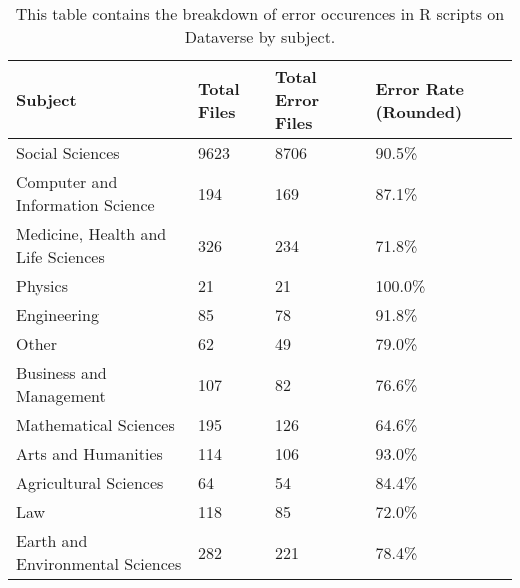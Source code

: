 \begin{table}
\centering
\caption{This table contains the breakdown of error occurences in R scripts on Dataverse by subject.}
\label{tab:subject-breakdown}
\begin{tabular}{llll}
\toprule
                           Subject & Total Files & Total Error Files & Error Rate (Rounded) \\
\midrule
                   Social Sciences &        9623 &              8706 &                90.5\% \\ \hline
  Computer and Information Science &         194 &               169 &                87.1\% \\ \hline
Medicine, Health and Life Sciences &         326 &               234 &                71.8\% \\ \hline
                           Physics &          21 &                21 &               100.0\% \\ \hline
                       Engineering &          85 &                78 &                91.8\% \\ \hline
                             Other &          62 &                49 &                79.0\% \\ \hline
           Business and Management &         107 &                82 &                76.6\% \\ \hline
             Mathematical Sciences &         195 &               126 &                64.6\% \\ \hline
               Arts and Humanities &         114 &               106 &                93.0\% \\ \hline
             Agricultural Sciences &          64 &                54 &                84.4\% \\ \hline
                               Law &         118 &                85 &                72.0\% \\ \hline
  Earth and Environmental Sciences &         282 &               221 &                78.4\% \\
\bottomrule
\end{tabular}
\end{table}
